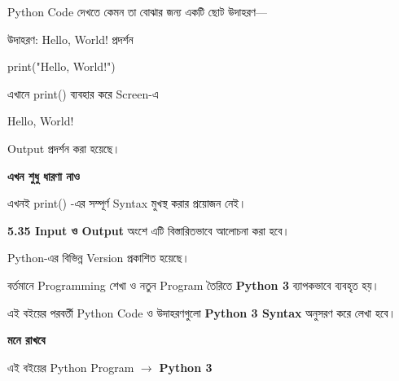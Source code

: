 

Python Code দেখতে কেমন তা বোঝার জন্য একটি ছোট উদাহরণ—

\begin{examplebox}{উদাহরণ: Hello, World! প্রদর্শন}

\begin{codebox}

\begin{english}
\ttfamily
print("Hello, World!")
\end{english}

\end{codebox}

এখানে
\textenglish{\ttfamily print()}
ব্যবহার করে Screen-এ

\textenglish{\ttfamily Hello, World!}

Output প্রদর্শন করা হয়েছে।

\end{examplebox}

\begin{rememberbox}

\textbf{\color{deepOrange}এখন শুধু ধারণা নাও}

এখনই
\textenglish{\ttfamily print()}
-এর সম্পূর্ণ Syntax মুখস্থ করার প্রয়োজন নেই।

\textbf{5.35 Input ও Output}
অংশে এটি বিস্তারিতভাবে আলোচনা করা হবে।

\end{rememberbox}



Python-এর বিভিন্ন Version প্রকাশিত হয়েছে।

বর্তমানে Programming শেখা ও নতুন Program তৈরিতে
\textbf{Python 3} ব্যাপকভাবে ব্যবহৃত হয়।

এই বইয়ের পরবর্তী Python Code ও উদাহরণগুলো
\textbf{Python 3 Syntax} অনুসরণ করে লেখা হবে।

\begin{rememberbox}

\textbf{\color{deepOrange}মনে রাখবে}

এই বইয়ের Python Program
\(\rightarrow\)
\textbf{Python 3}

\end{rememberbox}

